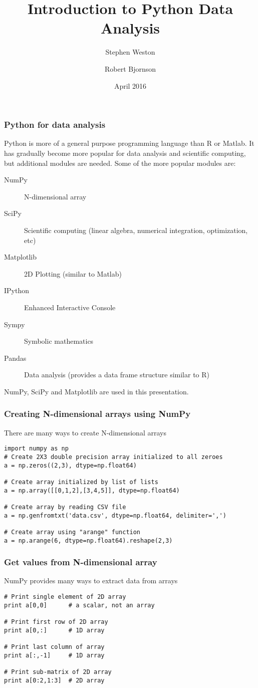 \documentclass[10pt]{beamer}
\title{Introduction to Python Data Analysis}
\author{{Stephen Weston} \and {Robert Bjornson}}
\institute[Yale]{
  Yale Center for Research Computing \\
  Yale University
}
\date{April 2016}
\begin{document}
\begin{frame}[plain]
  \titlepage
\end{frame}

\begin{frame}
\frametitle{Python for data analysis}
Python is more of a general purpose programming language than
R or Matlab.
It has gradually become more popular for data analysis and
scientific computing, but additional modules are needed.
Some of the more popular modules are:
\begin{description}
\item[NumPy] N-dimensional array
\item[SciPy] Scientific computing (linear algebra, numerical integration, optimization, etc)
\item[Matplotlib] 2D Plotting (similar to Matlab)
\item[IPython] Enhanced Interactive Console
\item[Sympy] Symbolic mathematics
\item[Pandas] Data analysis (provides a data frame structure similar to R)
\end{description}
\vskip10pt
NumPy, SciPy and Matplotlib are used in this presentation.
\end{frame}

\begin{frame}[fragile]
\frametitle{Creating N-dimensional arrays using NumPy}
There are many ways to create N-dimensional arrays
\begin{verbatim}
import numpy as np
# Create 2X3 double precision array initialized to all zeroes
a = np.zeros((2,3), dtype=np.float64)

# Create array initialized by list of lists
a = np.array([[0,1,2],[3,4,5]], dtype=np.float64)

# Create array by reading CSV file
a = np.genfromtxt('data.csv', dtype=np.float64, delimiter=',')

# Create array using "arange" function
a = np.arange(6, dtype=np.float64).reshape(2,3)
\end{verbatim}
\end{frame}

\begin{frame}[fragile]
\frametitle{Get values from N-dimensional array}
NumPy provides many ways to extract data from arrays
\begin{verbatim}
# Print single element of 2D array
print a[0,0]      # a scalar, not an array

# Print first row of 2D array
print a[0,:]      # 1D array

# Print last column of array
print a[:,-1]     # 1D array

# Print sub-matrix of 2D array
print a[0:2,1:3]  # 2D array

\end{verbatim}
\end{frame}
\end{document}
